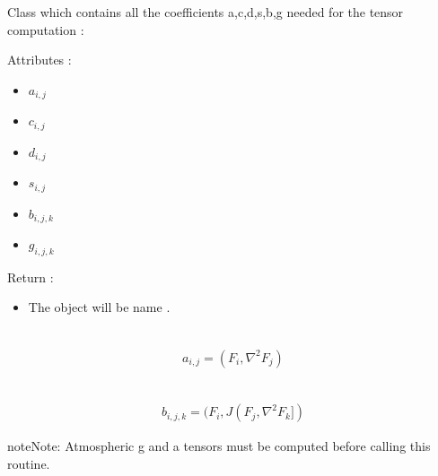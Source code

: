 \documentclass[letterpaper,10pt,english]{sphinxmanual}
\begin{document}
\begin{fulllineitems}
\label{rstfiles/inprod_analytic:inprod_analytic.atm_tensors}
Class which contains all the coefficients a,c,d,s,b,g needed for the tensor computation :

Attributes :
\begin{itemize}
\item {} 
\(a_{i,j}\)

\item {} 
\(c_{i,j}\)

\item {} 
\(d_{i,j}\)

\item {} 
\(s_{i,j}\)

\item {} 
\(b_{i,j,k}\)

\item {} 
\(g_{i,j,k}\)

\end{itemize}

Return :
\begin{itemize}
\item {} 
The object will be name .

\end{itemize}

\begin{fulllineitems}
\label{rstfiles/inprod_analytic:inprod_analytic.atm_tensors.calculate_a}~\begin{equation*}
\begin{split}a_{i,j} = (F_i, {\nabla}^2 F_j)\end{split}
\end{equation*}
\end{fulllineitems}


\begin{fulllineitems}
\label{rstfiles/inprod_analytic:inprod_analytic.atm_tensors.calculate_b}~\begin{equation*}
\begin{split}b_{i,j,k} = (F_i, J(F_j, \nabla^2 F_k])\end{split}
\end{equation*}
\begin{notice}{note}{Note:}
Atmospheric g and a tensors must be computed before calling this routine.
\end{notice}


\end{fulllineitems}
\end{fulllineitems}
\end{document}
